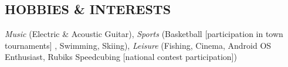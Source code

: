 \documentclass[margin, 10pt]{res} %
\begin{document}
\begin{resume}

\section{HOBBIES \& INTERESTS}

\textit{Music} (Electric \& Acoustic Guitar), \textit{Sports} (Basketball [participation in town tournaments] , Swimming, Skiing), \textit{Leisure} (Fishing, Cinema, Android OS Enthusiast, Rubik\’s Speedcubing [national contest participation])


\end{resume}
\end{document}
